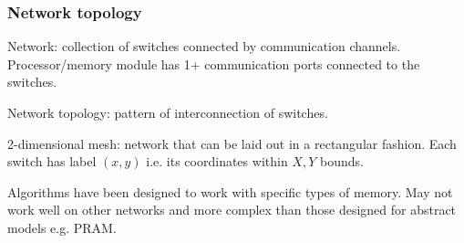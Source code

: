 \subsubsection{Network topology}

\begin{definition}
Network: collection of switches connected by communication channels. Processor/memory module has 1+ communication ports connected to the switches.
\end{definition}
\begin{definition}
Network topology: pattern of interconnection of switches.
\end{definition}
\begin{definition}
2-dimensional mesh: network that can be laid out in a rectangular fashion. Each switch has label $(x, y)$ i.e. its coordinates within $X, Y$ bounds.
\end{definition}

Algorithms have been designed to work with specific types of memory. May not work well on other networks and more complex than those designed for abstract models e.g. PRAM.

